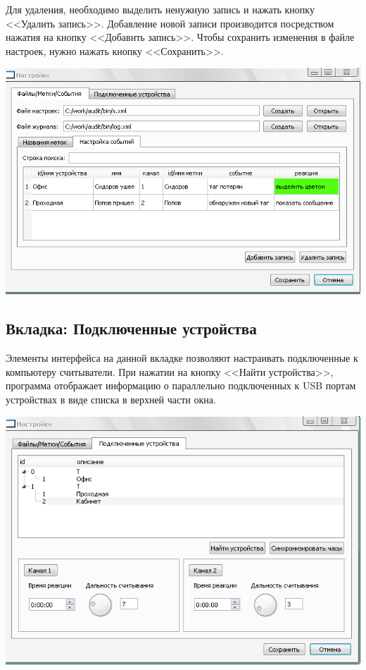 Для удаления, необходимо выделить ненужную 
запись и нажать кнопку <<Удалить запись>>. Добавление новой записи производится посредством нажатия на
кнопку <<Добавить запись>>. 
Чтобы сохранить изменения в файле настроек, нужно нажать кнопку <<Сохранить>>.

\begin{center}
    \includegraphics[scale=0.5]{img/settings_event.png}
\end{center}

\subsection{Вкладка: Подключенные устройства}

Элементы интерфейса на данной вкладке позволяют настраивать подключенные к компьютеру считыватели.
При нажатии на кнопку <<Найти устройства>>, программа отображает информацию о параллельно подключенных к USB портам устройствах в
виде списка в верхней части окна. 

\begin{center}
    \includegraphics[scale=0.5]{img/settings_dev.png}
\end{center}

